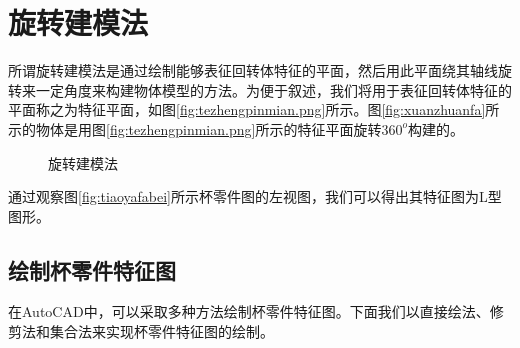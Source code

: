 \section{旋转建模法}
所谓旋转建模法是通过绘制能够表征回转体特征的平面，然后用此平面绕其轴线旋转来一定角度来构建物体模型的方法。为便于叙述，我们将用于表征回转体特征的平面称之为特征平面，如图\ref{fig:tezhengpinmian.png}所示。图\ref{fig:xuanzhuanfa}所示的物体是用图\ref{fig:tezhengpinmian.png}所示的特征平面旋转$360^o$构建的。
\begin{figure}[htbp]
\hspace{20pt}
\caption{旋转建模法}
\end{figure}
通过观察图\ref{fig:tiaoyafabei}所示杯零件图的左视图，我们可以得出其特征图为L型图形。
\subsection{绘制杯零件特征图}\label{sec:beilingjiantezheng}
在AutoCAD中，可以采取多种方法绘制杯零件特征图。下面我们以直接绘法、修剪法和集合法来实现杯零件特征图的绘制。
